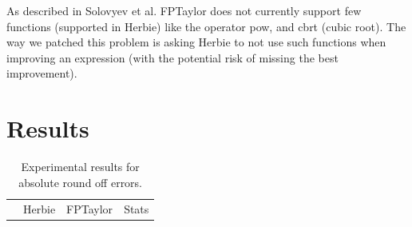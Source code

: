\documentclass[runningheads]{llncs}
\begin{document}
As described in Solovyev et al. FPTaylor does not currently support few functions (supported in Herbie) like the operator pow, and cbrt (cubic root). The way we patched this problem is asking Herbie to not use such functions when improving an expression (with the potential risk of missing the best improvement).

\section{Results}



\begin{table}[h]
	\centering
	\caption{Experimental results for absolute round off errors.}\label{tab1}
	\begin{adjustbox}{center}
	\begin{tabular}{l|c|c|c|c|c|c|c|c|c|}
		&
		\multicolumn{4}{|c|}{Herbie} & \multicolumn{2}{|c|}{FPTaylor}& \multicolumn{3}{|c|}{Stats} \\
		

\end{tabular}
\end{adjustbox}
\end{table}
\end{document}
